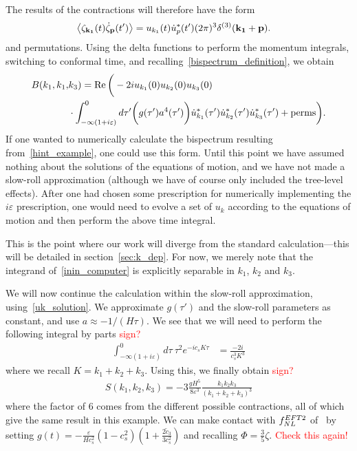 The results of the contractions will therefore have the form
\begin{align}
    \left<\zeta_{\mathbf{k_1}}(t)\dot{\zeta}_{\mathbf{p}}(t')\right>
    &= u_{k_1}(t)\dot{u}^*_{p}(t')(2\pi)^3\delta^{(3)}(\mathbf{k_1}+\mathbf{p}).
\end{align}
and permutations.
Using the delta functions to perform the momentum integrals,
switching to conformal time,
and recalling~\eqref{bispectrum_definition}, we obtain
\begin{align}\label{inin_computer}
    B(k_1, k_1,&k_3)
    =
    \operatorname{Re}\bigg(-2i u_{k_1}(0)u_{k_2}(0)u_{k_3}(0)\nonumber\\
    &\cdot\int_{-\infty(1+i\varepsilon)}^{0}d\tau'\bigg(g(\tau') a^4(\tau')\bigg)
    \dot{u}^*_{k_1}(\tau')
    \dot{u}^*_{k_2}(\tau')
    \dot{u}^*_{k_3}(\tau')
    +\text{perms}
    \bigg).
\end{align}
If one wanted to numerically calculate the bispectrum resulting from~\eqref{hint_example},
one could use this form. Until this point we have assumed nothing about the solutions of the
equations of motion, and we have not made a slow-roll approximation (although we have
of course only included the tree-level effects).
After one had chosen some prescription for numerically implementing the
$i\varepsilon$ prescription, one would need to evolve a set of $u_{k}$
according to the equations of motion and then perform the above time integral.


This is the point where our work will diverge from the standard calculation---this
will be detailed in section~\ref{sec:k_dep}. For now, we merely note that
the integrand of~\eqref{inin_computer} is explicitly separable in $k_1$, $k_2$ and $k_3$.


We will now continue the calculation within the slow-roll approximation,
using~\eqref{uk_solution}. We approximate $g(\tau')$ and the slow-roll
parameters as constant, and use $a\approx-1/(H\tau)$.
We see that we will need to perform the following integral by parts
\textcolor{red}{sign?}
\begin{align}
    \int_{-\infty(1+i\varepsilon)}^{0}d\tau~\tau^2 e^{-ic_sK\tau}
    &= \frac{-2i}{c_s^3K^3}
\end{align}
where we recall $K=k_1+k_2+k_3$.
Using this, we finally obtain
\textcolor{red}{sign?}
\begin{align}
    S(k_1, k_2, k_3) = -3\frac{g H^5}{8\varepsilon^3}\frac{k_1k_2k_3}{(k_1+k_2+k_3)^3}
\end{align}
where the factor of $6$ comes from the different possible contractions, all
of which give the same result in this example.
We can make contact with $f_{NL}^{EFT2}$ of~\cite{Planck_NG_2018, Senatore_wmap_2009}
by setting $g(t)=-\frac{\varepsilon}{Hc_s^2}(1-c_s^2)\left(1+\frac{2\tilde{c}_3}{3c_s^2}\right)$
and recalling $\Phi=\frac{3}{5}\zeta$.
\textcolor{red}{Check this again!}


